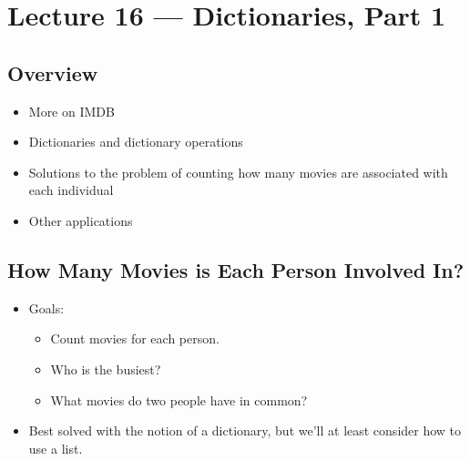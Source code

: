 \documentclass[letterpaper,10pt,english]{sphinxmanual}
\begin{document}
\chapter{Lecture 16 — Dictionaries, Part 1}
\label{\detokenize{lecture_notes/lec16_dictionaries1:lecture-16-dictionaries-part-1}}\label{\detokenize{lecture_notes/lec16_dictionaries1::doc}}

\section{Overview}
\label{\detokenize{lecture_notes/lec16_dictionaries1:overview}}\begin{itemize}
\item {} 
More on IMDB

\item {} 
Dictionaries and dictionary operations

\item {} 
Solutions to the problem of counting how many movies are associated with each individual

\item {} 
Other applications

\end{itemize}


\section{How Many Movies is Each Person Involved In?}
\label{\detokenize{lecture_notes/lec16_dictionaries1:how-many-movies-is-each-person-involved-in}}\begin{itemize}
\item {} 
Goals:
\begin{itemize}
\item {} 
Count movies for each person.

\item {} 
Who is the busiest?

\item {} 
What movies do two people have in common?

\end{itemize}

\item {} 
Best solved with the notion of a dictionary, but we’ll at least
consider how to use a list.

\end{itemize}
\end{document}
